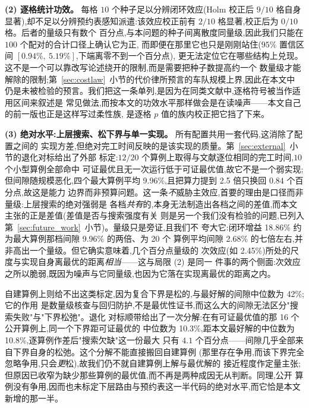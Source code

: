 \documentclass[manuscript,screen,review]{acmart}
\newcommand{\NCases}{10}
\newcommand{\NSeeds}{10}
\newcommand{\NPairs}{100}
\newcommand{\GainLoopRule}{18.86\%}      %
\newcommand{\GainProbeLoop}{2.45\%}      %
\newcommand{\CIProbeLoop}{$[0.94\%,\ 5.19\%]$}
\newcommand{\CellsSigLoopAdj}{9}
\newcommand{\CellsSigProbe}{2}
\newcommand{\CellsSigProbeAdj}{0}
\newcommand{\LBGapMed}{42\%}
\newcommand{\PubNInst}{20}
\newcommand{\PubNOpt}{16}                 %
\newcommand{\PubNMatch}{12}               %
\newcommand{\PubGapMean}{2.68\%}          %
\newcommand{\PubGapBig}{9.96\%}           %
\newcommand{\PubBudgetRatio}{2.5}
\newcommand{\PubBudgetGainPP}{0.84}       %
\newcommand{\PubLBSlack}{10.3\%}          %
\newcommand{\PubLBTotal}{10.8\%}          %
\newcommand{\PubLBResidMax}{4.1}          %
\begin{document}
\textbf{(2) 逐格统计功效。} 每格 $\NSeeds$ 个种子足以分辨闭环效应(Holm 校正后
$\CellsSigLoopAdj/\NCases$ 格自身显著),却不足以分辨预约表感知派遣:该效应校正前有
$\CellsSigProbe/\NCases$ 格显著,校正后为 $\CellsSigProbeAdj/\NCases$ 格。后者的量级只有数个
百分点,与本问题的种子间离散度同量级,因此我们只能在 $\NPairs$ 个配对的合计口径上确认它为正,
而即便在那里它也只是刚刚站住($95\%$ 置信区间 \CIProbeLoop{},下端离零不到一个百分点),
更无法定位它在哪些结构上兑现。这不是一个可以靠改写论述绕开的限制,而是需要把种子数提高约一个
数量级才能解除的限制;第~\ref{sec:costlaw}~小节的代价律所预言的车队规模上界,因此在本文中
仍是未被检验的预言。我们把这一条单列,是因为在同类文献中,逐格符号被当作适用区间来叙述是
常见做法,而按本文的功效水平那样做会是在读噪声——本文自己的前一版也正是这样写过柔性族,
是逐格 $p$ 值的族内校正把它挡了下来。

\textbf{(3) 绝对水平:上层搜索、松下界与单一实现。} 所有配置共用一套代码,这消除了配置之间的
实现方差,但绝对完工时间反映的是该实现的质量。第~\ref{sec:external}~小节的退化对标给出了外部
标定:$\PubNMatch{}/\PubNInst{}$ 个算例上取得与文献逐位相同的完工时间,$10$ 个小型算例全部命中
可证最优且无一次运行低于可证最优值,故它不是一个弱实现;但间隙随规模恶化,四个最大算例平均
\PubGapBig{},且把算力提到 \PubBudgetRatio{} 倍只换回 $\PubBudgetGainPP$ 个百分点,故这是能力
边界而非预算问题。这一条\emph{不}威胁主效应,首要的理由是口径而非量级:上层搜索的绝对强弱是
各档\emph{共有}的,本身无法制造出各档之间的差值,而本文主张的正是差值(差值是否与搜索强度有关
则是另一个我们没有检验的问题,已列入第~\ref{sec:future_work}~小节)。量级只是旁证,且我们不
夸大它:闭环增益 \GainLoopRule{} 约为最大算例那档间隙 \PubGapBig{} 的两倍、为 \PubNInst{} 个
算例平均间隙 \PubGapMean{} 的七倍左右,并非高出一个量级。但它确实意味着,几个百分点量级的
次效应(如 \GainProbeLoop{})所处的尺度与实现自身离最优的距离\emph{相当}——这与局限 (2) 是同一
件事的两个侧面:次效应之所以脆弱,既因为噪声与它同量级,也因为它落在实现离最优的距离之内。

自建算例上则给不出这类标定,因为复合下界是松的,与最好解的间隙中位数为 \LBGapMed{};它的作用
是数量级核查与回归防护,不是最优性证书,而这么大的间隙无法区分"搜索失败"与"下界松弛"。退化
对标顺带给出了一次分解:在有可证最优值的那 \PubNOpt{} 个公开算例上,同一个下界距可证最优的
中位数为 \PubLBSlack{},距本文最好解的中位数为 \PubLBTotal{},逐算例作差后"搜索欠缺"这一份最大
只有 $\PubLBResidMax$ 个百分点——间隙几乎全部来自下界自身的松弛。这个分解不能直接搬回自建算例
(那里存在争用,而该下界完全忽略争用,只会\emph{更}松),故我们仍不就自建算例上解与最优解的
接近程度作定量主张;但原因已收窄为缺少那些算例的最优值,而不再是两种成因无从判断。同理,公开
算例没有争用,因而也未标定下层路由与预约表这一半代码的绝对水平,而它恰是本文新增的那一半。
\end{document}
